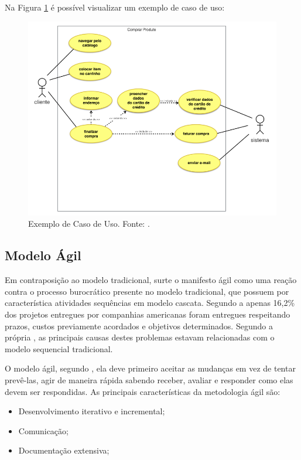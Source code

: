 Na Figura \ref{img:exemplo_caso_de_uso} é possível visualizar um exemplo de caso de uso:

\begin{figure}[H]
	\centering
	\includegraphics[width=1.0\textwidth]{figuras/caso_de_uso_exemplo.png}
	\caption{Exemplo de Caso de Uso. Fonte: \cite{casos_de_uso}.}
	\label{img:exemplo_caso_de_uso}
\end{figure}

\subsection{Modelo Ágil}
\label{sec:modelo_agil}

Em contraposição ao modelo tradicional, surte o manifesto ágil como uma reação contra o processo burocrático presente no modelo tradicional, que possuem por característica atividades sequências em modelo cascata. Segundo a \cite{chaos} apenas 16,2\% dos projetos entregues por companhias americanas foram entregues respeitando prazos, custos previamente acordados e objetivos determinados. Segundo a própria \cite{chaos}, as principais causas destes problemas estavam relacionadas com o modelo sequencial tradicional.

O modelo ágil, segundo \cite{soares}, ela deve primeiro aceitar as mudanças em vez de tentar prevê-las, agir de maneira rápida sabendo receber, avaliar e responder como elas devem ser respondidas. As principais características da metodologia ágil são:

\begin{itemize}
	\item Desenvolvimento iterativo e incremental;
	\item Comunicação;
	\item Documentação extensiva; 
\end{itemize}

